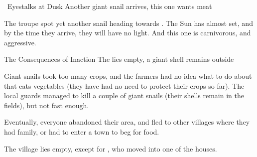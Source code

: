 {~Eyestalks at Dusk}%
{Another giant snail arrives, this one wants meat}%

The troupe spot yet another snail heading towards .
The Sun has almost set, and by the time they arrive, they will have no light.
And this one is carnivorous, and aggressive.

{The Consequences of Inaction}%
{The  lies empty, a giant shell remains outside}%

Giant snails took too many crops, and the farmers had no idea what to do about  that eats vegetables (they have had no need to protect their crops so far).
The local \glspl{guard} managed to kill a couple of giant snails (their shells remain in the fields), but not fast enough.

Eventually, everyone abandoned their area, and fled to other \glspl{village} where they had family, or had to enter a town to beg for food.

The \gls{village} lies empty, except for , who moved into one of the houses.

\chitincrawler

